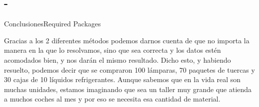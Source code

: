 \documentclass[10pt,xcolor={dvipsnames}]{beamer}
\begin{document}
\subsection{-}
\begin{frame}{Conclusiones}{Required Packages}

  Gracias a los 2 diferentes métodos podemos darnos cuenta de que no importa la manera en la que lo resolvamos, sino que sea correcta y los datos estén acomodados bien, y nos darán el mismo resultado. Dicho esto, y habiendo resuelto, podemos decir que se compraron 100 lámparas, 70 paquetes de tuercas y 30 cajas de 10 líquidos refrigerantes. Aunque sabemos que en la vida real son muchas unidades, estamos imaginando que sea un taller muy grande que atienda a muchos coches al mes y por eso se necesita esa cantidad de material.

  
\end{frame}




{\1
\begin{frame}
\end{frame}}
\end{document}
